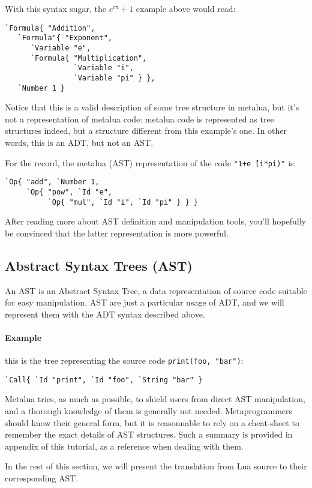 With this syntax sugar, the $e^{i\pi}+1$ example above would read:
\begin{verbatim}
`Formula{ "Addition", 
   `Formula"{ "Exponent", 
      `Variable "e",
      `Formula{ "Multiplication", 
                `Variable "i",
                `Variable "pi" } },
   `Number 1 }
\end{verbatim}

Notice that this is a valid description of some tree structure in metalua, but
it's not a representation of metalua code: metalua code is represented as tree
structures indeed, but a structure different from this example's one. In other
words, this is an ADT, but not an AST.

For the record, the metalua (AST) representation of the code {\tt"1+e\^\ (i*pi)"}
is:
\begin{verbatim}
`Op{ "add", `Number 1,
     `Op{ "pow", `Id "e", 
          `Op{ "mul", `Id "i", `Id "pi" } } }
\end{verbatim}

After reading more about AST definition and manipulation tools, you'll hopefully
be convinced that the latter representation is more powerful.

\subsection{Abstract Syntax Trees (AST)}

An AST is an Abstract Syntax Tree, a data representation of source
code suitable for easy manipulation. AST are just a particular usage
of ADT, and we will represent them with the ADT syntax described
above.

\paragraph{Example} this is the tree representing the source code
\verb+print(foo, "bar")+:

\verb+`Call{ `Id "print", `Id "foo", `String "bar" }+

Metalua tries, as much as possible, to shield users from direct AST
manipulation, and a thorough knowledge of them is generally not
needed. Metaprogrammers should know their general form, but it is
reasonnable to rely on a cheat-sheet to remember the exact details of
AST structures. Such a summary is provided
in appendix of this tutorial, as a reference when dealing with them.

In the rest of this section, we will present the translation from Lua
source to their corresponding AST.

